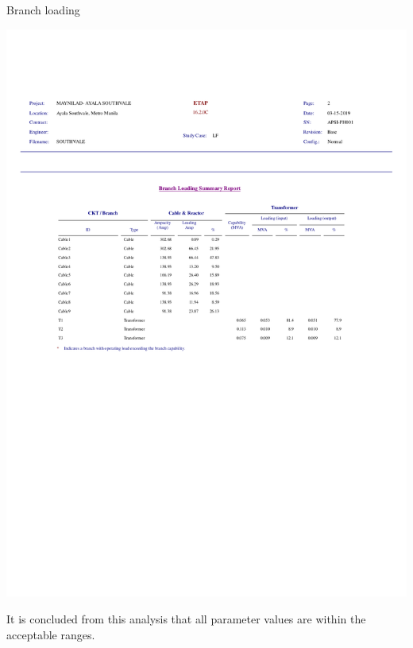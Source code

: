 \begin{table}[]
	\caption{Branch loading}
	\label{tbl_ch04_elecaudit_load_flow_analysis03}
	\includegraphics[width=\textwidth]{tables/tbl_ch04_elecaudit_load_flow_analysis03.pdf}		
\end{table}

It is concluded from this analysis that all parameter values are within the acceptable ranges.

%


